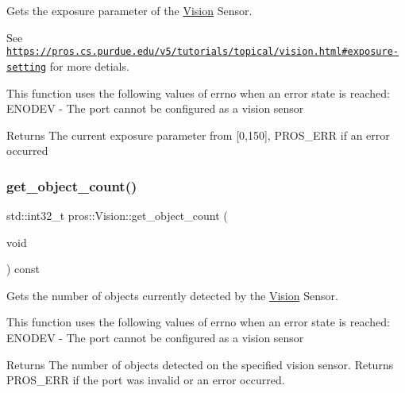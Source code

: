 Gets the exposure parameter of the \hyperlink{classpros_1_1Vision}{Vision} Sensor. 

See \href{https://pros.cs.purdue.edu/v5/tutorials/topical/vision.html#exposure-setting}{\tt https\+://pros.\+cs.\+purdue.\+edu/v5/tutorials/topical/vision.\+html\#exposure-\/setting} for more detials.

This function uses the following values of errno when an error state is reached\+: E\+N\+O\+D\+EV -\/ The port cannot be configured as a vision sensor

\begin{DoxyReturn}{Returns}
The current exposure parameter from \mbox{[}0,150\mbox{]}, P\+R\+O\+S\+\_\+\+E\+RR if an error occurred 
\end{DoxyReturn}
\mbox{\label{classpros_1_1Vision_a73869f85b3d2e468ffc51957d80f5a75}} 
\subsubsection{\texorpdfstring{get\+\_\+object\+\_\+count()}{get\_object\_count()}}
{\footnotesize\ttfamily std\+::int32\+\_\+t pros\+::\+Vision\+::get\+\_\+object\+\_\+count (\begin{DoxyParamCaption}\item[{void}]{ }\end{DoxyParamCaption}) const}



Gets the number of objects currently detected by the \hyperlink{classpros_1_1Vision}{Vision} Sensor. 

This function uses the following values of errno when an error state is reached\+: E\+N\+O\+D\+EV -\/ The port cannot be configured as a vision sensor

\begin{DoxyReturn}{Returns}
The number of objects detected on the specified vision sensor. Returns P\+R\+O\+S\+\_\+\+E\+RR if the port was invalid or an error occurred. 
\end{DoxyReturn}
\mbox{\label{classpros_1_1Vision_af1d1bc18fd7dacfd23d9dfc403b7d419}} 
